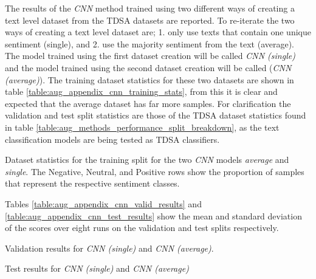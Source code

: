 The results of the \textit{CNN} method trained using two different ways of creating a text level dataset from the TDSA datasets are reported. To re-iterate the two ways of creating a text level dataset are; 1. only use texts that contain one unique sentiment (single), and 2. use the majority sentiment from the text (average). The model trained using the first dataset creation will be called \textit{CNN (single)} and the model trained using the second dataset creation will be called (\textit{CNN (average)}). The training dataset statistics for these two datasets are shown in table \ref{table:aug_appendix_cnn_training_stats}, from this it is clear and expected that the average dataset has far more samples. For clarification the validation and test split statistics are those of the TDSA dataset statistics found in table \ref{table:aug_methods_performance_split_breakdown}, as the text classification models are being tested as TDSA classifiers.
\begin{table}[ht!]
    \centering
    
    \caption{Dataset statistics for the training split for the two \textit{CNN} models \textit{average} and \textit{single}. The Negative, Neutral, and Positive rows show the proportion of samples that represent the respective sentiment classes.}
    \label{table:aug_appendix_cnn_training_stats}
\end{table}

Tables \ref{table:aug_appendix_cnn_valid_results} and \ref{table:aug_appendix_cnn_test_results} show the mean and standard deviation of the scores over eight runs on the validation and test splits respectively.

\begin{table}[ht!]
    \centering
    
    \caption{Validation results for \textit{CNN (single)} and \textit{CNN (average)}.}
    \label{table:aug_appendix_cnn_valid_results}
\end{table}

\begin{table}[ht!]
    \centering
    
    \caption{Test results for \textit{CNN (single)} and \textit{CNN (average)}}
    \label{table:aug_appendix_cnn_test_results}
\end{table}

